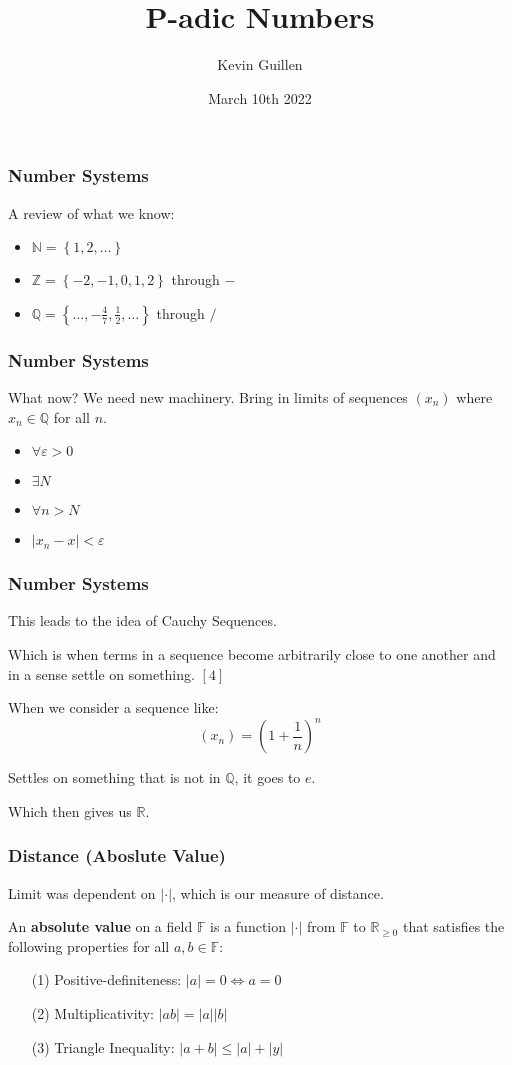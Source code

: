 \documentclass{beamer}
\title{P-adic Numbers}
\author{Kevin Guillen}
\institute{UC Santa Cruz}
\date{March 10th 2022}
\newcommand{\zz}{\mathbb Z}   %
\newcommand{\qq}{\mathbb Q}   %
\newcommand{\ff}{\mathbb F}   %
\newcommand{\rr}{\mathbb R}   %
\newcommand{\nn}{\mathbb N}   %
\newcommand{\abs}[1]{\left\lvert#1\right\rvert} %
\renewcommand{\epsilon}{\varepsilon}
\renewcommand{\geq}{\geqslant}
\renewcommand{\leq}{\leqslant}
\newcommand{\lrp}[1]{\left(#1\right)}
\newcommand{\lrb}[1]{\left[#1\right]}
\newcommand{\lrc}[1]{\left\{#1\right\}}
\begin{document}
    \frame{\titlepage}

    \begin{frame}
        \frametitle{Number Systems}
        A review of what we know:
        \begin{itemize}
            \item<1-> $\nn = \lrc{1, 2, \dots }$
            \item<2-> $\zz = \lrc{-2, -1, 0, 1, 2}$ through $-$
            \item<3-> $\qq = \lrc{\dots, -\frac{4}{7}, \frac{1}{2}, \dots}$ through $/$
        \end{itemize}
    \end{frame}

    \begin{frame}
        \frametitle{Number Systems}
        What now? We need new machinery. 
        Bring in limits of sequences $(x_n)$ where $x_n \in \qq$ for all $n$. 
        \\
        \begin{itemize}
            \item<1-> $\forall \epsilon > 0$
            \item<2-> $\exists N$
            \item<3-> $\forall n > N$
            \item<4-> $\abs{x_n - x} < \epsilon$
        \end{itemize} 
    \end{frame}

    \begin{frame}
        \frametitle{Number Systems}
        This leads to the idea of Cauchy Sequences.\pause 
        
        Which is when terms in a sequence become arbitrarily close to one another and in a sense settle on something. $\lrb{4}$ \pause
        
        When we consider a sequence like:
        \[(x_n) = \lrp{1 + \dfrac{1}{n}}^{n}\] \pause

        Settles on something that is not in $\qq$\pause,
        it goes to $e$. 

        Which then gives us $\rr$.
    \end{frame}

    \begin{frame}
        \frametitle{Distance (Aboslute Value)}
        Limit was dependent on $\abs{\cdot}$, which is our measure of distance. \pause

        An \textbf{absolute value} on a field $\ff$ is a function $\abs{\cdot}$ from $\ff$ to $\rr_{\geq 0}$ that satisfies the following properties for all $a,b \in \ff$:
        \begin{itemize}
        \item[(1)]Positive-definiteness: $\abs{a} = 0 \Longleftrightarrow a = 0$  
        \item[(2)]Multiplicativity: $\abs{ab} = \abs{a} \abs{b}$ 
        \item[(3)]Triangle Inequality: $\abs{a + b} \leq \abs{a} + \abs{y}$
        \end{itemize} 
    \end{frame}
\end{document}
